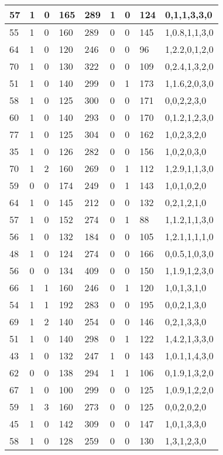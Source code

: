 \documentclass{article}
\begin{document}
\begin{table}[h!]
\begin{tabular}{|l|l|l|l|l|l|l|l|l|}
57 & 1 & 0 & 165 & 289 & 1 & 0 & 124 & 0,1,1,3,3,0 \\ \hline
55 & 1 & 0 & 160 & 289 & 0 & 0 & 145 & 1,0.8,1,1,3,0 \\ \hline
64 & 1 & 0 & 120 & 246 & 0 & 0 & 96 & 1,2.2,0,1,2,0 \\ \hline
70 & 1 & 0 & 130 & 322 & 0 & 0 & 109 & 0,2.4,1,3,2,0 \\ \hline
51 & 1 & 0 & 140 & 299 & 0 & 1 & 173 & 1,1.6,2,0,3,0 \\ \hline
58 & 1 & 0 & 125 & 300 & 0 & 0 & 171 & 0,0,2,2,3,0 \\ \hline
60 & 1 & 0 & 140 & 293 & 0 & 0 & 170 & 0,1.2,1,2,3,0 \\ \hline
77 & 1 & 0 & 125 & 304 & 0 & 0 & 162 & 1,0,2,3,2,0 \\ \hline
35 & 1 & 0 & 126 & 282 & 0 & 0 & 156 & 1,0,2,0,3,0 \\ \hline
70 & 1 & 2 & 160 & 269 & 0 & 1 & 112 & 1,2.9,1,1,3,0 \\ \hline
59 & 0 & 0 & 174 & 249 & 0 & 1 & 143 & 1,0,1,0,2,0 \\ \hline
64 & 1 & 0 & 145 & 212 & 0 & 0 & 132 & 0,2,1,2,1,0 \\ \hline
57 & 1 & 0 & 152 & 274 & 0 & 1 & 88 & 1,1.2,1,1,3,0 \\ \hline
56 & 1 & 0 & 132 & 184 & 0 & 0 & 105 & 1,2.1,1,1,1,0 \\ \hline
48 & 1 & 0 & 124 & 274 & 0 & 0 & 166 & 0,0.5,1,0,3,0 \\ \hline
56 & 0 & 0 & 134 & 409 & 0 & 0 & 150 & 1,1.9,1,2,3,0 \\ \hline
66 & 1 & 1 & 160 & 246 & 0 & 1 & 120 & 1,0,1,3,1,0 \\ \hline
54 & 1 & 1 & 192 & 283 & 0 & 0 & 195 & 0,0,2,1,3,0 \\ \hline
69 & 1 & 2 & 140 & 254 & 0 & 0 & 146 & 0,2,1,3,3,0 \\ \hline
51 & 1 & 0 & 140 & 298 & 0 & 1 & 122 & 1,4.2,1,3,3,0 \\ \hline
43 & 1 & 0 & 132 & 247 & 1 & 0 & 143 & 1,0.1,1,4,3,0 \\ \hline
62 & 0 & 0 & 138 & 294 & 1 & 1 & 106 & 0,1.9,1,3,2,0 \\ \hline
67 & 1 & 0 & 100 & 299 & 0 & 0 & 125 & 1,0.9,1,2,2,0 \\ \hline
59 & 1 & 3 & 160 & 273 & 0 & 0 & 125 & 0,0,2,0,2,0 \\ \hline
45 & 1 & 0 & 142 & 309 & 0 & 0 & 147 & 1,0,1,3,3,0 \\ \hline
58 & 1 & 0 & 128 & 259 & 0 & 0 & 130 & 1,3,1,2,3,0 \\ \hline

\end{tabular}
\end{table}
\end{document}
